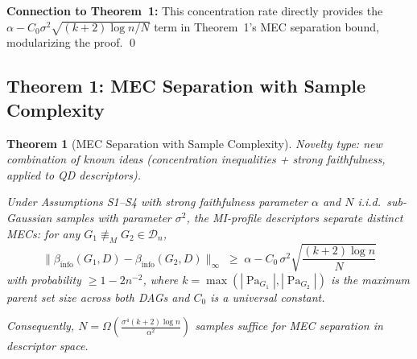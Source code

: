 \documentclass{article}
\theoremstyle{definition}
\theoremstyle{plain}
\newtheorem{theorem}{Theorem}
\theoremstyle{remark}
\DeclareMathOperator{\Pa}{Pa}
\begin{document}
\textbf{Connection to Theorem~1:} This concentration rate directly provides the
$\alpha - C_0\sigma^2\sqrt{(k+2)\log n / N}$ term in Theorem~1's MEC separation bound,
modularizing the proof. \qed

\subsection{Theorem 1: MEC Separation with Sample Complexity}

\begin{theorem}[MEC Separation with Sample Complexity]
\label{thm:mec_separation}
\emph{Novelty type: new combination of known ideas (concentration inequalities +
strong faithfulness, applied to QD descriptors).}

Under Assumptions S1--S4 with strong faithfulness parameter $\alpha$ and $N$
i.i.d.\ sub-Gaussian samples with parameter $\sigma^2$, the MI-profile
descriptors separate distinct MECs: for any
$G_1 \not\equiv_M G_2 \in \mathcal{D}_n$,
\begin{equation}
  \label{eq:mec_sep}
  \|\beta_{\mathrm{info}}(G_1, D) - \beta_{\mathrm{info}}(G_2, D)\|_\infty
  \;\geq\; \alpha - C_0\,\sigma^2\sqrt{\frac{(k+2)\log n}{N}}
\end{equation}
with probability $\geq 1 - 2n^{-2}$, where $k = \max(|\Pa_{G_1}|, |\Pa_{G_2}|)$
is the maximum parent set size across both DAGs and $C_0$ is a universal constant.

Consequently, $N = \Omega\!\left(\frac{\sigma^4(k+2)\log n}{\alpha^2}\right)$
samples suffice for MEC separation in descriptor space.
\end{theorem}
\end{document}
